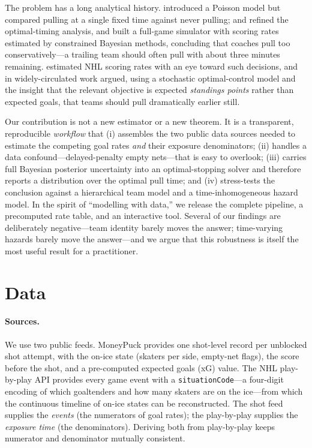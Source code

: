 \documentclass[11pt]{article}
\begin{document}
The problem has a long analytical history. \citet{morrison1976optimal} introduced
a Poisson model but compared pulling at a single fixed time against never pulling;
\citet{morrison1986pulling} and \citet{washburn1991still} refined the
optimal-timing analysis, and \citet{beaudoin2010strategies} built a full-game
simulator with scoring rates estimated by constrained Bayesian methods, concluding
that coaches pull too conservatively---a trailing team should often pull with about
three minutes remaining. \citet{buttrey2011estimating} estimated NHL scoring rates
with an eye toward such decisions, and in widely-circulated work
\citet{brown2018pulling} argued, using a stochastic optimal-control model and the
insight that the relevant objective is expected \emph{standings points} rather than
expected goals, that teams should pull dramatically earlier still.

Our contribution is not a new estimator or a new theorem. It is a transparent,
reproducible \emph{workflow} that (i) assembles the two public data sources needed
to estimate the competing goal rates \emph{and} their exposure denominators;
(ii) handles a data confound---delayed-penalty empty nets---that is easy to
overlook; (iii) carries full Bayesian posterior uncertainty into an
optimal-stopping solver and therefore reports a distribution over the optimal pull
time; and (iv) stress-tests the conclusion against a hierarchical team model and a
time-inhomogeneous hazard model. In the spirit of ``modelling with data,'' we
release the complete pipeline, a precomputed rate table, and an interactive tool.
Several of our findings are deliberately negative---team identity barely moves the
answer; time-varying hazards barely move the answer---and we argue that this
robustness is itself the most useful result for a practitioner.

\section{Data}
\label{sec:data}

\paragraph{Sources.} We use two public feeds. MoneyPuck \citep{moneypuck} provides
one shot-level record per unblocked shot attempt, with the on-ice state (skaters
per side, empty-net flags), the score before the shot, and a pre-computed expected
goals (xG) value. The NHL play-by-play API \citep{nhlapi} provides every game
event with a \texttt{situationCode}---a four-digit encoding of which goaltenders
and how many skaters are on the ice---from which the continuous timeline of on-ice
states can be reconstructed. The shot feed supplies the \emph{events} (the
numerators of goal rates); the play-by-play supplies the \emph{exposure time} (the
denominators). Deriving both from play-by-play keeps numerator and denominator
mutually consistent.
\end{document}
